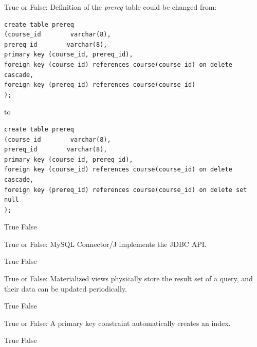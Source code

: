 \documentclass[12pt]{exam}
\begin{document}
\begin{questions}
\begin{minipage}{\linewidth}
\question[2]
True or False: Definition of the \textit{prereq} table could be changed from: \par\vspace{0.5em}
\begin{verbatim}
create table prereq
(course_id        varchar(8), 
prereq_id        varchar(8),
primary key (course_id, prereq_id),
foreign key (course_id) references course(course_id) on delete cascade,
foreign key (prereq_id) references course(course_id)
);
\end{verbatim}
to\par\vspace{0.5em}
\begin{verbatim}
create table prereq
(course_id        varchar(8), 
prereq_id        varchar(8),
primary key (course_id, prereq_id),
foreign key (course_id) references course(course_id) on delete cascade,
foreign key (prereq_id) references course(course_id) on delete set null
);
\end{verbatim}
\begin{checkboxes}
    \choice True
    \CorrectChoice False
\end{checkboxes}
\end{minipage}\vspace{1em}

\begin{minipage}{\linewidth}
\question[2]
True or False: MySQL Connector/J implements the JDBC API.\par\vspace{0.5em}
\begin{checkboxes}
    \CorrectChoice True
    \choice False
\end{checkboxes}
\end{minipage}\vspace{1em}

\begin{minipage}{\linewidth}
\question[2]
True or False: Materialized views physically store the result set of a query, and their data can be updated periodically.\par\vspace{0.5em}
\begin{checkboxes}
    \CorrectChoice True
    \choice False
\end{checkboxes}
\end{minipage}\vspace{1em}

\begin{minipage}{\linewidth}
\question[2]
True or False: A primary key constraint automatically creates an index.\par\vspace{0.5em}
\begin{checkboxes}
    \CorrectChoice True
    \choice False
\end{checkboxes}
\end{minipage}\vspace{1em}


\end{questions}
\end{document}
